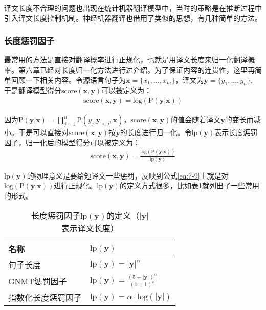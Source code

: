 \parinterval 译文长度不合理的问题也出现在统计机器翻译模型中，当时的策略是在推断过程中引入译文长度控制机制。神经机器翻译也借用了类似的思想，有几种简单的方法。


\subsubsection{长度惩罚因子}

\parinterval 最常用的方法是直接对翻译概率进行正规化，也就是用译文长度来归一化翻译概率。第六章已经对长度归一化方法进行过介绍。为了保证内容的连贯性，这里再简单回顾一下相关内容。令源语言句子为$\mathbf{x}=\{ x_1, ...,x_m \}$，译文为$\mathbf{y}=\{ y_1,...,y_n\}$, 于是翻译模型得分$\textrm{score}(\mathbf{x},\mathbf{y})$可以被定义为：
\begin{eqnarray}
\textrm{score}(\mathbf{x},\mathbf{y}) = \textrm{log}(\textrm{P}(\mathbf{y} | \mathbf{x}))
\label{eq:7-8}
\end{eqnarray}

\noindent 因为$\textrm{P}(\mathbf{y} | \mathbf{x}) = \prod_{j=1}^{n} \textrm{P}(y_j | \mathbf{y}_{<j},\mathbf{x}) $，$\textrm{score}(\mathbf{x},\mathbf{y})$的值会随着译文$\mathbf{y}$的变长而减小。于是可以直接对$\textrm{score}(\mathbf{x},\mathbf{y})$按$\mathbf{y}$的长度进行归一化。令$\textrm{lp}(\mathbf{y})$表示长度惩罚因子，归一化后的模型得分可以被定义为：
\begin{eqnarray}
\textrm{score}(\mathbf{x},\mathbf{y}) = \frac{ \textrm{log}(\textrm{P}(\mathbf{y} | \mathbf{x}))}{\textrm{lp}(\mathbf{y})}
\label{eq:7-9}
\end{eqnarray}

\parinterval $\textrm{lp}(\mathbf{y})$的物理意义是要给短译文一些惩罚，反映到公式\ref{eq:7-9}上就是对$\textrm{log}(\textrm{P}(\mathbf{y} | \mathbf{x}))$进行正规化。$\textrm{lp}(\mathbf{y})$的定义方式很多，比如表\ref{tab:7-5}就列出了一些常用的形式。

\begin{table}[htp]
\centering
\caption{长度惩罚因子$\textrm{lp}(\mathbf{y})$的定义（$|\mathbf{y}|$表示译文长度）}
\begin{tabular}{ l | l }
\rule{0pt}{15pt}	名称			& $\textrm{lp}(\mathbf{y})$ \\ \hline
\rule{0pt}{15pt}	句子长度 & $\textrm{lp}(\mathbf{y})=|\mathbf{y}|^{\alpha}$ \\
\rule{0pt}{15pt}	GNMT惩罚因子 & $\textrm{lp}(\mathbf{y})=\frac{(5+|\mathbf{y}|)^{\alpha}}{(5+1)^{\alpha}}$ \\
\rule{0pt}{15pt}	指数化长度惩罚因子 & $\textrm{lp}(\mathbf{y}) = \alpha \cdot \textrm{log}(|\mathbf{y}|) $
\end{tabular}
\label{tab:7-5}
\end{table}

